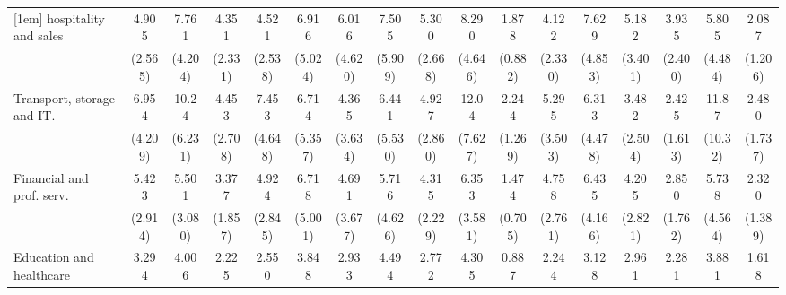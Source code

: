 {\begin{tabular}{l*{16}{c}}
[1em]
hospitality and sales&       4.905\sym{**} &       7.761\sym{***}&       4.351\sym{**} &       4.521\sym{**} &       6.916\sym{**} &       6.016\sym{*}  &       7.505\sym{*}  &       5.300\sym{***}&       8.290\sym{***}&       1.878         &       4.122\sym{*}  &       7.629\sym{**} &       5.182\sym{*}  &       3.935\sym{*}  &       5.805\sym{*}  &       2.087         \\
                    &     (2.565)         &     (4.204)         &     (2.331)         &     (2.538)         &     (5.024)         &     (4.620)         &     (5.909)         &     (2.668)         &     (4.646)         &     (0.882)         &     (2.330)         &     (4.853)         &     (3.401)         &     (2.400)         &     (4.484)         &     (1.206)         \\
[1em]
Transport, storage and IT.&       6.954\sym{**} &       10.24\sym{***}&       4.453\sym{*}  &       7.453\sym{**} &       6.714\sym{*}  &       4.365         &       6.441\sym{*}  &       4.927\sym{**} &       12.04\sym{***}&       2.244         &       5.295\sym{*}  &       6.313\sym{**} &       3.482         &       2.425         &       11.87\sym{**} &       2.480         \\
                    &     (4.209)         &     (6.231)         &     (2.708)         &     (4.648)         &     (5.357)         &     (3.634)         &     (5.530)         &     (2.860)         &     (7.627)         &     (1.269)         &     (3.503)         &     (4.478)         &     (2.504)         &     (1.613)         &     (10.32)         &     (1.737)         \\
[1em]
Financial and prof. serv.&       5.423\sym{**} &       5.501\sym{**} &       3.377\sym{*}  &       4.924\sym{**} &       6.718\sym{*}  &       4.691\sym{*}  &       5.716\sym{*}  &       4.315\sym{**} &       6.353\sym{**} &       1.474         &       4.758\sym{**} &       6.435\sym{**} &       4.205\sym{*}  &       2.850         &       5.738\sym{*}  &       2.320         \\
                    &     (2.914)         &     (3.080)         &     (1.857)         &     (2.845)         &     (5.001)         &     (3.677)         &     (4.626)         &     (2.229)         &     (3.581)         &     (0.705)         &     (2.761)         &     (4.166)         &     (2.821)         &     (1.762)         &     (4.564)         &     (1.389)         \\
[1em]
Education and healthcare&       3.294\sym{*}  &       4.006\sym{*}  &       2.225         &       2.550         &       3.848         &       2.933         &       4.494         &       2.772         &       4.305\sym{*}  &       0.887         &       2.244         &       3.128         &       2.961         &       2.281         &       3.881         &       1.618         \\

\end{tabular}}
